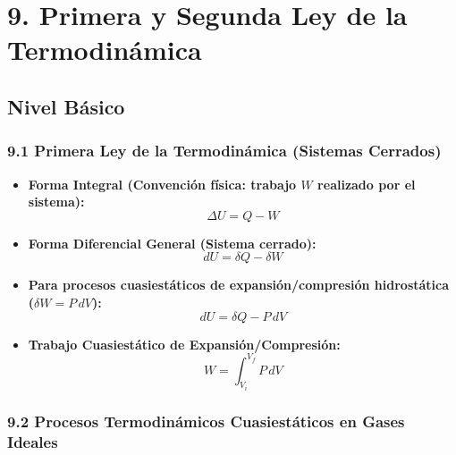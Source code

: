 \documentclass[11pt,a4paper]{article}
\begin{document}
\section*{9. Primera y Segunda Ley de la Termodinámica}

\subsection*{Nivel Básico}

\subsubsection*{9.1 Primera Ley de la Termodinámica (Sistemas Cerrados)}

\begin{itemize}
  \item \textbf{Forma Integral (Convención física: trabajo $W$ realizado por el sistema):}
  \[
    \Delta U = Q - W
  \]
  \item \textbf{Forma Diferencial General (Sistema cerrado):}
  \[
    dU = \delta Q - \delta W
  \]
  \item \textbf{Para procesos cuasiestáticos de expansión/compresión hidrostática ($\delta W = P \, dV$):}
  \[
    dU = \delta Q - P \, dV
  \]
  \item \textbf{Trabajo Cuasiestático de Expansión/Compresión:}
  \[
    W = \int_{V_i}^{V_f} P \, dV
  \]
\end{itemize}

\subsubsection*{9.2 Procesos Termodinámicos Cuasiestáticos en Gases Ideales}
\end{document}

